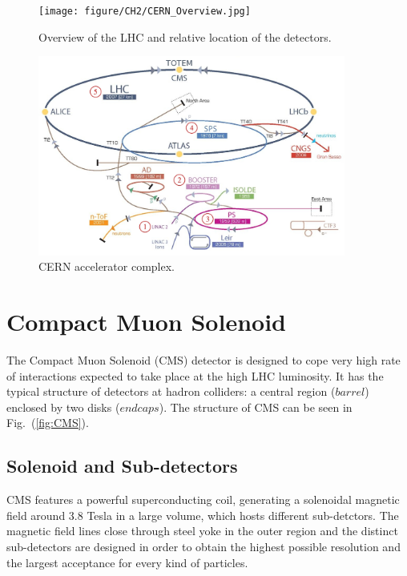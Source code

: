 \begin{figure}[hbtp]
  \begin{center}
    \texttt{[image: figure/CH2/CERN\_Overview.jpg]}
  \end{center}
  \caption{\label{fig:LHC_overview}Overview of the LHC and relative location of the detectors.}
\end{figure}

\begin{figure}[hbtp]
  \begin{center}
    \includegraphics[width=0.9\textwidth]{figure/CH2/complex.png}
  \end{center}
  \caption{\label{fig:accelerator}CERN accelerator complex.}
\end{figure}

\section{Compact Muon Solenoid}
The Compact Muon Solenoid (CMS) detector is designed to cope very high rate of interactions expected to take place at the high LHC luminosity. It has the typical structure of detectors at hadron colliders: a central region ($barrel$) enclosed by two disks ($endcaps$). The structure of CMS can be seen in Fig.~(\ref{fig:CMS}).

\subsection*{Solenoid and Sub-detectors}
CMS features a powerful superconducting coil, generating a solenoidal magnetic field around 3.8 Tesla in a large volume, which hosts different sub-detctors. The magnetic field lines close through steel yoke in the outer region and the distinct sub-detectors are designed in order to obtain the highest possible resolution and the largest acceptance for every kind of particles.

